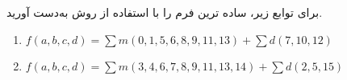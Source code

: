 برای توابع زیر، ساده ترین فرم  را با استفاده از روش  به‌دست آورید.

\begin{latin}
	\begin{enumerate}
		\item %
		$f(a,b,c,d)=\sum m(0,1,5,6,8,9,11,13) + \sum d(7,10,12)$
		
		\item %
		$f(a,b,c,d)=\sum m(3,4,6,7,8,9,11,13,14) + \sum d(2,5,15)$
	\end{enumerate} 
\end{latin}